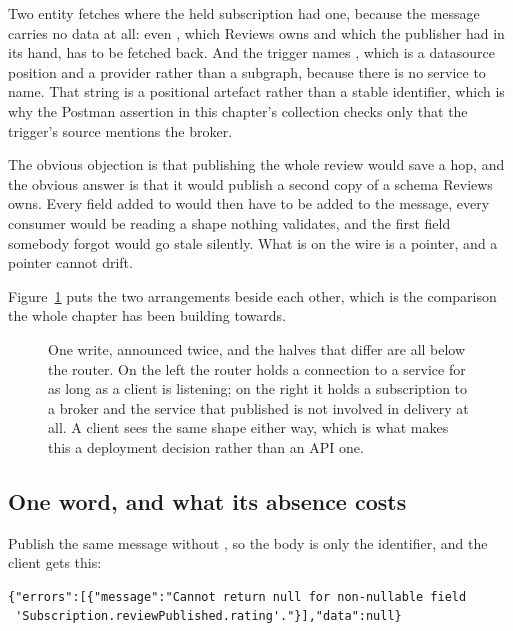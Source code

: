 Two entity fetches where the held subscription had one, because the message
carries no data at all: even , which Reviews owns and which the
publisher had in its hand, has to be fetched back. And the trigger names
, which is a datasource position and a provider rather than a
subgraph, because there is no service to name. That string is a positional
artefact rather than a stable identifier, which is why the Postman assertion in
this chapter's collection checks only that the trigger's source mentions the
broker.

%
The obvious objection is that publishing the whole review would save a hop, and
the obvious answer is that it would publish a second copy of a schema Reviews
owns. Every field added to  would then have to be added to the
message, every consumer would be reading a shape nothing validates, and the
first field somebody forgot would go stale silently. What is on the wire is a
pointer, and a pointer cannot drift.

Figure~\ref{fig:ch14-two-arrangements} puts the two arrangements beside each
other, which is the comparison the whole chapter has been building towards.

\begin{figure}[htbp]
  \centering
  
  \caption{One write, announced twice, and the halves that differ are all below
  the router. On the left the router holds a connection to a service for as
  long as a client is listening; on the right it holds a subscription to a
  broker and the service that published is not involved in delivery at all. A
  client sees the same shape either way, which is what makes this a deployment
  decision rather than an API one.}
  \label{fig:ch14-two-arrangements}
\end{figure}

\subsection*{One word, and what its absence costs}

%
Publish the same message without , so the body is only the
identifier, and the client gets this:

\begin{verbatim}
{"errors":[{"message":"Cannot return null for non-nullable field
 'Subscription.reviewPublished.rating'."}],"data":null}
\end{verbatim}

